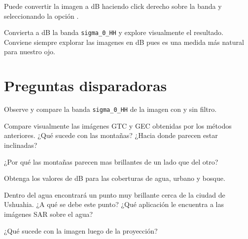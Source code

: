 Puede convertir la imagen a dB haciendo click derecho sobre la banda y seleccionando la opción .

Convierta a dB la banda \texttt{sigma\_0\_HH} y explore visualmente el resultado. Conviene siempre explorar las imagenes en dB pues es una medida más natural para nuestro ojo.

\section{Preguntas disparadoras}

\begin{que}
    Observe y compare la banda \texttt{sigma\_0\_HH} de la imagen con y sin filtro.
\end{que}

\begin{que}
    Compare visualmente las imágenes GTC y GEC obtenidas por los métodos anteriores. ¿Qué sucede con las montañas? ¿Hacia donde parecen estar inclinadas?
\end{que}

\begin{que}
    ¿Por qué las montañas parecen mas brillantes de un lado que del otro?
\end{que}

\begin{que}
    Obtenga los valores de dB para las coberturas de agua, urbano y bosque.
\end{que}

\begin{que}
    Dentro del agua encontrará un punto muy brillante cerca de la ciudad de Ushuahia. ¿A qué se debe este punto? ¿Qué aplicación le encuentra a las imágenes SAR sobre el agua?
\end{que}

\begin{que}
    ¿Qué sucede con la imagen luego de la proyección?
\end{que}
